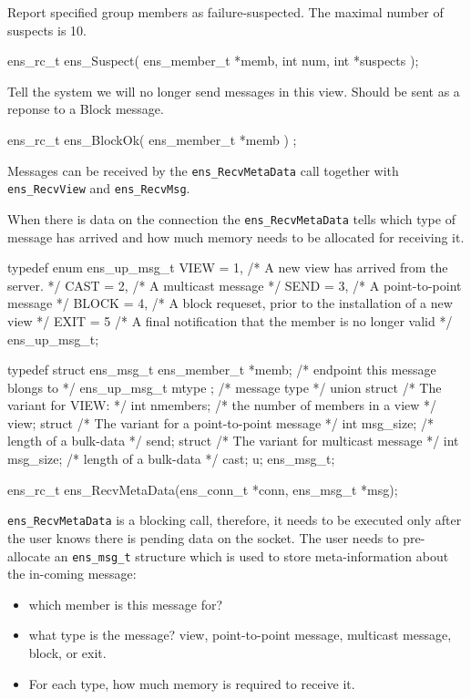 Report specified group members as failure-suspected. The maximal
number of suspects is 10. 
\begin{codebox}
ens_rc_t ens_Suspect(
    ens_member_t *memb,
    int num,
    int *suspects
     );
\end{codebox}

Tell the system we will no longer send messages in this view. Should
be sent as a reponse to a Block message.
\begin{codebox}
ens_rc_t ens_BlockOk(
    ens_member_t *memb
    ) ;
\end{codebox}

Messages can be received by the {\tt ens\_RecvMetaData} call together
with {\tt ens\_RecvView} and {\tt ens\_RecvMsg}. 

When there is data on the connection the {\tt ens\_RecvMetaData} tells
which type of message has arrived and how much memory needs to be
allocated for receiving it. 

\begin{codebox}
typedef enum ens_up_msg_t {
    VIEW = 1,      /* A new view has arrived from the server. */
    CAST = 2,      /* A multicast message */
    SEND = 3,      /* A point-to-point message */
    BLOCK = 4,     /* A block requeset, prior to the installation of a new view */
    EXIT = 5       /* A final notification that the member is no longer valid */
} ens_up_msg_t;

typedef struct ens_msg_t {
    ens_member_t *memb;        /* endpoint this message blongs to */
    ens_up_msg_t mtype ;       /* message type */
    union {
	struct {               /* The variant for VIEW: */
	    int     nmembers;  /* the number of members in a view */    
	} view;
	struct {               /* The variant for a point-to-point message */
	    int     msg_size;  /* length of a bulk-data */
	} send;
	struct {               /* The variant for multicast message */
	    int     msg_size;  /* length of a bulk-data */
	} cast;
    } u;
} ens_msg_t;


ens_rc_t ens_RecvMetaData(ens_conn_t *conn, ens_msg_t *msg);
\end{codebox}

{\tt ens\_RecvMetaData} is a blocking call, therefore, it needs to be
executed only after the user knows there is pending data on the
socket. The user needs to pre-allocate an {\tt ens\_msg\_t} structure
which is used to store meta-information about the in-coming message: 
\begin{itemize}
\item which member is this message for? 
\item what type is the message?
  view, point-to-point message, multicast message, block, or exit.
\item For each type, how much memory is required to receive it. 
\end{itemize}

